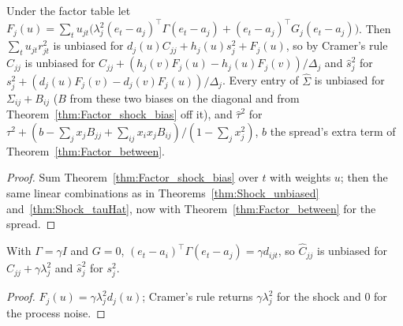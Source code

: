 \begin{theorem}\label{thm:Factor_shock_diag}
  \leanok
  Under the factor table let
  $F_j(u) = \sum_t u_{jt}\bigl(\lambda_j^2(e_t - a_j)^\top\Gamma(e_t - a_j) + (e_t - a_j)^\top G_j(e_t - a_j)\bigr)$.
  Then $\sum_t u_{jt}r_{jt}^2$ is unbiased for $d_j(u)C_{jj} + h_j(u)s_j^2 + F_j(u)$, so by
  Cramer's rule $\hat C_{jj}$ is unbiased for $C_{jj} + (h_j(v)F_j(u) - h_j(u)F_j(v))/\Delta_j$
  and $\hat s_j^2$ for $s_j^2 + (d_j(u)F_j(v) - d_j(v)F_j(u))/\Delta_j$. Every entry of
  $\hat\Sigma$ is unbiased for $\Sigma_{ij} + B_{ij}$ ($B$ from these two biases on the
  diagonal and from Theorem~\ref{thm:Factor_shock_bias} off it), and $\hat\tau^2$ for
  $\tau^2 + (b - \sum_j x_jB_{jj} + \sum_{ij}x_ix_jB_{ij})/(1 - \sum_j x_j^2)$, $b$ the
  spread's extra term of Theorem~\ref{thm:Factor_between}.
\end{theorem}
\begin{proof}
  \leanok
  Sum Theorem~\ref{thm:Factor_shock_bias} over $t$ with weights $u$; then the same linear
  combinations as in Theorems~\ref{thm:Shock_unbiased} and~\ref{thm:Shock_tauHat}, now with
  Theorem~\ref{thm:Factor_between} for the spread.
\end{proof}

\begin{corollary}\label{cor:Factor_shock_diag_indep}
  \leanok
  With $\Gamma = \gamma I$ and $G = 0$, $(e_t - a_i)^\top\Gamma(e_t - a_j) = \gamma d_{ijt}$, so
  $\hat C_{jj}$ is unbiased for $C_{jj} + \gamma\lambda_j^2$ and $\hat s_j^2$ for $s_j^2$.
\end{corollary}
\begin{proof}
  \leanok
  $F_j(u) = \gamma\lambda_j^2 d_j(u)$; Cramer's rule returns $\gamma\lambda_j^2$ for the shock and
  $0$ for the process noise.
\end{proof}


